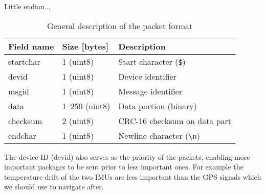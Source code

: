 \documentclass{article}
\begin{document}
Little endian...  

\begin{table}[htbp]
	\centering
	\begin{tabular}{lll}
		\toprule
		\textbf{Field name} & \textbf{Size [bytes]} & \textbf{Description}\\
		\midrule
		startchar & 1 (uint8) & Start character (\texttt{\$}) \\
		devid & 1 (uint8) & Device identifier \\
		msgid & 1 (uint8) & Message identifier \\
		data & 1--250 (uint8) & Data portion (binary)\\
		checksum & 2 (uint8) & CRC-16 checksum on data part \\
		endchar & 1 (uint8) & Newline character (\texttt{\textbackslash n})\\
		\bottomrule
	\end{tabular}
	\caption{General description of the packet format}
	\label{tab:general}
\end{table}

The device ID (devid) also serves as the priority of the packets, enabling more important packages to be sent prior to less important ones. For example the temperature drift of the two \ac{IMU}s are less important than the \ac{GPS} signals which we should use to navigate after. 
\end{document}
